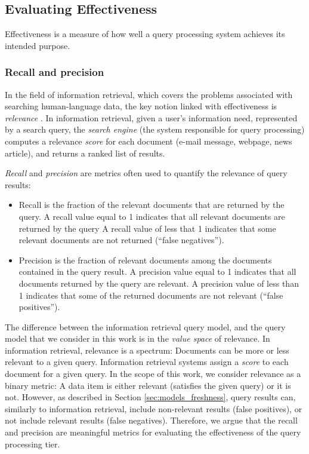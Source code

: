 \subsection{Evaluating Effectiveness}

Effectiveness is a measure of how well a query processing system achieves its intended purpose.

\subsubsection{Recall and precision}

In the field of information retrieval, which covers the problems associated with searching human-language data,
the key notion linked with effectiveness is \textit{relevance} \cite{buttcher:informationretrieval}.
In information retrieval, given a user's information need, represented by a search query, the \textit{search engine}
(the system responsible for query processing) computes a relevance \textit{score} for each document (e-mail message,
webpage, news article), and returns a ranked list of results.

\textit{Recall} and \textit{precision} are metrics often used to quantify the relevance of query results:
\begin{itemize}
  \item Recall is the fraction of the relevant documents that are returned by the query.
  A recall value equal to 1 indicates that all relevant documents are returned by the query
  A recall value of less that 1 indicates that some relevant documents are not returned (``false negatives'').

  \item Precision is the fraction of relevant documents among the documents contained in the query result.
  A precision value equal to 1 indicates that all documents returned by the query are relevant.
  A precision value of less than 1 indicates that some of the returned documents are not relevant (``false positives'').
\end{itemize}

The difference between the information retrieval query model, and the query model that we consider in this work is in the
\textit{value space} of relevance.
In information retrieval, relevance is a spectrum:
Documents can be more or less relevant to a given query.
Information retrieval systems assign a \textit{score} to each document for a given query.
In the scope of this work, we consider relevance as a binary metric:
A data item is either relevant (satisfies the given query) or it is not.
However, as described in Section \ref{sec:models_freshness},
query results can, similarly to information retrieval, include non-relevant results (false positives),
or not include relevant results (false negatives).
Therefore, we argue that the recall and precision are meaningful metrics for evaluating the effectiveness of the query processing tier.

